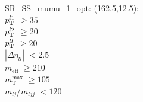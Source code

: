 SR\_SS\_mumu\_1\_opt: (162.5,12.5): \\
$p_{\text{T}}^{l1}$ $\geq 35$ \\
$p_{\text{T}}^{l2}$ $\geq 20$ \\
$p_{\text{T}}^{ll}$ $\geq 20$ \\
$|\Delta\eta_{ll}|$ $<2.5$ \\
$m_{\text{eff}}$ $\geq 210$ \\
$m_{\text{T}}^{\text{max}}$ $\geq 105$ \\
$m_{lj}$/$m_{ljj}$ $<120$ \\
